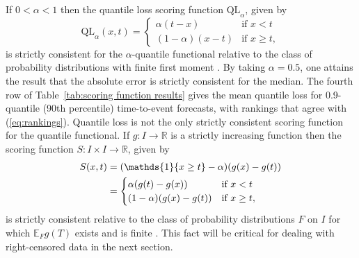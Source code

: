 \documentclass[10pt]{article} %
\theoremstyle{theorem}
\theoremstyle{definition}
\newcommand{\RRR}{\mathbb{R}}
\newcommand{\EEE}{\mathbb{E}}
\newcommand{\one}{\mathds{1}}
\newcommand{\QL}{\mathrm{QL}}
\begin{document}
If $0<\alpha<1$ then the quantile loss scoring function $\QL_\alpha$, given by
\begin{equation}\label{eq:check loss}
\QL_\alpha(x,t) = \begin{cases}
\alpha(t - x) & \text{if } x < t \\
(1-\alpha)(x - t) & \text{if } x \geq t,
\end{cases}
\end{equation}
is strictly consistent for the $\alpha$-quantile functional relative to the class of probability distributions with finite first moment \citep{raiffa1961applied}. By taking $\alpha=0.5$, one attains the result that the absolute error is strictly consistent for the median. The fourth row of Table~\ref{tab:scoring function results} gives the mean quantile loss for 0.9-quantile (90th percentile) time-to-event forecasts, with rankings that agree with (\ref{eq:rankings}). Quantile loss is not the only strictly consistent scoring function for the quantile functional. If $g:I\to\RRR$ is a strictly increasing function then the scoring function $S:I\times I\to\RRR$, given by
\begin{align}
S(x,t) 
&= (\one\{x\geq t\} - \alpha)(g(x)-g(t)) \label{eq:consistent quantile sf} \\
&= \begin{cases}
\alpha(g(t) - g(x)) & \text{if } x < t \\
(1-\alpha)(g(x) - g(t)) & \text{if } x \geq t,
\end{cases} \notag
\end{align}
is strictly consistent relative to the class of probability distributions $F$ on $I$ for which $\EEE_F g(T)$ exists and is finite \citep{thomson1978eliciting, saerens2000building, gneiting2011quantiles}. This fact will be critical for dealing with right-censored data in the next section.
\end{document}
